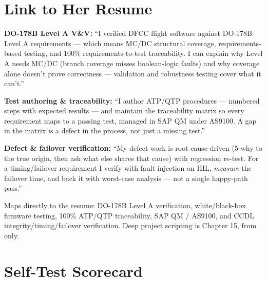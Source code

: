 \section{Link to Her Resume}

\begin{resumelink}
\textbf{DO-178B Level A V\&V:} ``I verified DFCC flight software against DO-178B
Level A requirements --- which means MC/DC structural coverage, requirements-based
testing, and 100\% requirements-to-test traceability. I can explain why Level A
needs MC/DC (branch coverage misses boolean-logic faults) and why coverage alone
doesn't prove correctness --- validation and robustness testing cover what it
can't.''

\medskip
\textbf{Test authoring \& traceability:} ``I author ATP/QTP procedures --- numbered
steps with expected results --- and maintain the traceability matrix so every
requirement maps to a passing test, managed in SAP QM under AS9100. A gap in the
matrix is a defect in the process, not just a missing test.''

\medskip
\textbf{Defect \& failover verification:} ``My defect work is root-cause-driven
(5-why to the true origin, then ask what else shares that cause) with regression
re-test. For a timing/failover requirement I verify with fault injection on HIL,
\emph{measure} the failover time, and back it with worst-case analysis --- not a
single happy-path pass.''

\medskip
\small Maps directly to the resume: DO-178B Level A verification, white/black-box
firmware testing, 100\% ATP/QTP traceability, SAP QM / AS9100, and CCDL
integrity/timing/failover verification. Deep project scripting is Chapter 15,
from  only.
\end{resumelink}

\section{Self-Test Scorecard}

